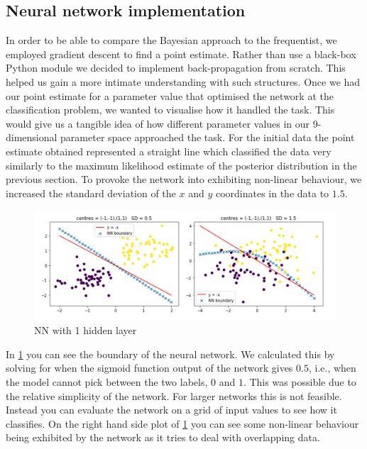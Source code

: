 \documentclass[review]{siamart190516}
\begin{document}
\subsection{Neural network implementation}
In order to be able to compare the Bayesian approach to the frequentist, we employed gradient descent to find a point estimate. Rather than use a black-box Python module we decided to implement back-propagation from scratch. This helped us gain a more intimate understanding with such structures.
\newline
Once we had our point estimate for a parameter value that optimised the network at the classification problem, we wanted to visualise how it handled the task. This would give us a tangible idea of how different parameter values in our 9-dimensional parameter space approached the task. For the initial data the point estimate obtained represented a straight line which classified the data very similarly to the maximum likelihood estimate of the posterior distribution in the previous section. To provoke the network into exhibiting non-linear behaviour, we increased the standard deviation of the $x$ and $y$ coordinates in the data to $1.5$.
\newline 
\begin{figure}[h!]
    \centering
    \includegraphics[width = \textwidth]{Images/1.png}
    \caption{NN with 1 hidden layer}
    \label{fig:1}
\end{figure}
In \ref{fig:1} you can see the boundary of the neural network. We calculated this by solving for when the sigmoid function output of the network gives $0.5$, i.e., when the model cannot pick between the two labels, $0$ and $1$. This was possible due to the relative simplicity of the network. For larger networks this is not feasible. Instead you can evaluate the network on a grid of input values to see how it classifies.
\newline
On the right hand side plot of \ref{fig:1} you can see some non-linear behaviour being exhibited by the network as it tries to deal with overlapping data.
\end{document}
